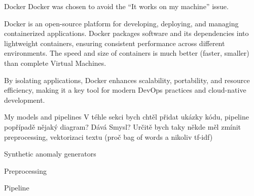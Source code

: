 \secc Docker
Docker was chosen to avoid the ``It works on my machine'' issue.

Docker is an open-source platform for developing, deploying, and managing containerized applications. Docker packages software and its dependencies into lightweight containers, ensuring consistent performance across different environments. The speed and size of containers is much better (faster, smaller) than complete Virtual Machines.

By isolating applications, Docker enhances scalability, portability, and resource efficiency, making it a key tool for modern DevOps practices and cloud-native development.

\sec My models and pipelines
V téhle sekci bych chtěl přidat ukázky kódu, pipeline popřípadě nějaký diagram? Dává Smysl?
Určitě bych taky někde měl zmínit preprocessing, vektorizaci textu (proč bag of words a nikoliv tf-idf)

\secc Synthetic anomaly generators

\secc Preprocessing

\secc Pipeline